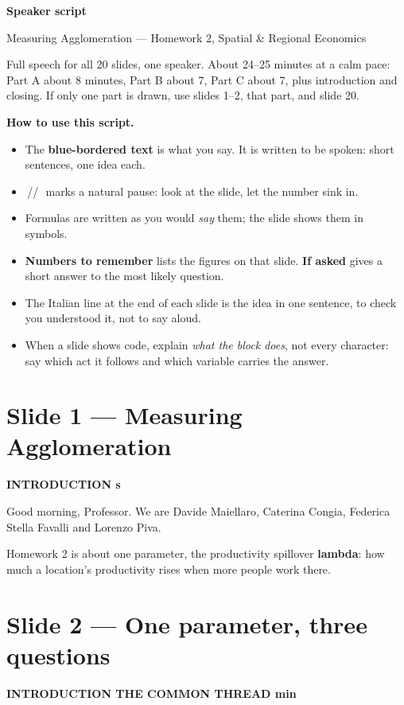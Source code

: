 \documentclass[11pt,a4paper]{article}
\newcommand{\slide}[3]{\Needspace{14\baselineskip}\section{#1}\textcolor{unicared}{\small\bfseries\MakeUppercase{#3}\quad\textperiodcentered\quad #2}\par}
\newcommand{\pause}{\textcolor{unicared}{\,/\!/\,}}
\begin{document}
{\color{unicablue}\Huge\bfseries Speaker script\par}
\vspace{2pt}
{\Large Measuring Agglomeration --- Homework 2, Spatial \& Regional Economics\par}
\vspace{6pt}
{\small Full speech for all 20 slides, one speaker. About 24--25 minutes at a calm pace: Part A about 8 minutes, Part B about 7, Part C about 7, plus introduction and closing. If only one part is drawn, use slides 1--2, that part, and slide 20.}

\begin{tcolorbox}[colback=tint,colframe=tint,arc=0pt]
\small
\textbf{How to use this script.}
\begin{itemize}[leftmargin=14pt,itemsep=1pt,topsep=2pt]
  \item The \textbf{blue-bordered text} is what you say. It is written to be spoken: short sentences, one idea each.
  \item \pause\ marks a natural pause: look at the slide, let the number sink in.
  \item Formulas are written as you would \emph{say} them; the slide shows them in symbols.
  \item \textbf{Numbers to remember} lists the figures on that slide. \textbf{If asked} gives a short answer to the most likely question.
  \item The Italian line at the end of each slide is the idea in one sentence, to check you understood it, not to say aloud.
  \item When a slide shows code, explain \emph{what the block does}, not every character: say which act it follows and which variable carries the answer.
\end{itemize}
\end{tcolorbox}

\slide{Slide 1 --- Measuring Agglomeration}{20 s}{Introduction}

\begin{say}
Good morning, Professor. We are Davide Maiellaro, Caterina Congia, Federica Stella Favalli and Lorenzo Piva.

Homework 2 is about one parameter, the productivity spillover \textbf{lambda}: how much a location's productivity rises when more people work there.
\end{say}

\slide{Slide 2 --- One parameter, three questions}{1 min}{Introduction \textperiodcentered{} the common thread}
\end{document}
